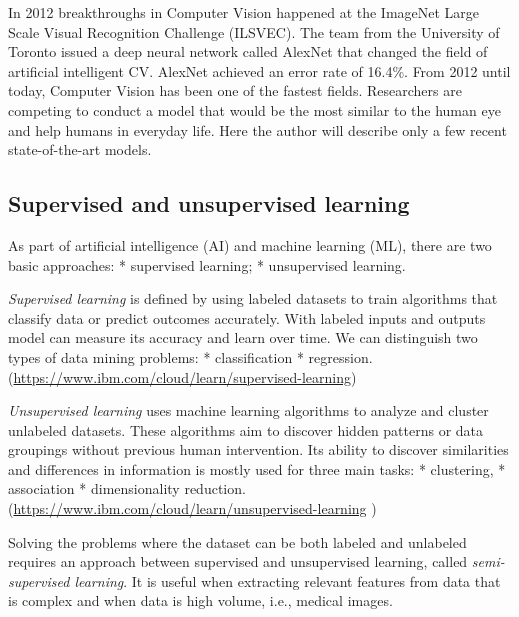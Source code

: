 \documentclass[
]{krantz}
\begin{document}
In 2012 breakthroughs in Computer Vision happened at the ImageNet Large Scale Visual Recognition Challenge (ILSVEC). The team from the University of Toronto issued a deep neural network called AlexNet that changed the field of artificial intelligent CV. AlexNet achieved an error rate of 16.4\%.
From 2012 until today, Computer Vision has been one of the fastest fields. Researchers are competing to conduct a model that would be the most similar to the human eye and help humans in everyday life. Here the author will describe only a few recent state-of-the-art models.

\hypertarget{supervised-and-unsupervised-learning}{%
\subsection{Supervised and unsupervised learning}\label{supervised-and-unsupervised-learning}}

As part of artificial intelligence (AI) and machine learning (ML), there are two basic approaches:
* supervised learning;
* unsupervised learning.

\emph{Supervised learning} is defined by using labeled datasets to train algorithms that classify data or predict outcomes accurately. With labeled inputs and outputs model can measure its accuracy and learn over time. We can distinguish two types of data mining problems:
* classification
* regression. (\url{https://www.ibm.com/cloud/learn/supervised-learning})

\emph{Unsupervised learning} uses machine learning algorithms to analyze and cluster unlabeled datasets. These algorithms aim to discover hidden patterns or data groupings without previous human intervention. Its ability to discover similarities and differences in information is mostly used for three main tasks:
* clustering,
* association
* dimensionality reduction. (\url{https://www.ibm.com/cloud/learn/unsupervised-learning} )

Solving the problems where the dataset can be both labeled and unlabeled requires an approach between supervised and unsupervised learning, called \emph{semi-supervised learning}. It is useful when extracting relevant features from data that is complex and when data is high volume, i.e., medical images.
\end{document}
